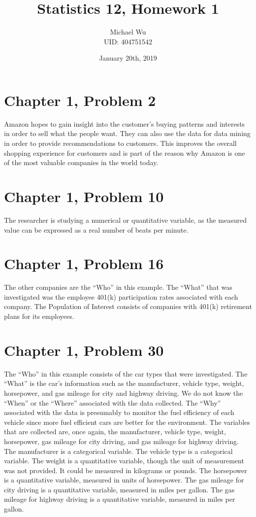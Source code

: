 \documentclass[12pt]{article}
\begin{document}
\title{Statistics 12, Homework 1}
\date{January 20th, 2019}
\author{Michael Wu\\UID: 404751542}
\maketitle

\section*{Chapter 1, Problem 2}

Amazon hopes to gain insight into the customer's buying patterns and interests in order to sell what the people want.
They can also use the data for data mining in order to provide recommendations to customers. This improves the
overall shopping experience for customers and is part of the reason why Amazon is one of the most valuable companies
in the world today.

\section*{Chapter 1, Problem 10}

The researcher is studying a numerical or quantitative variable, as the measured value can be expressed as a
real number of beats per minute.

\section*{Chapter 1, Problem 16}

The other companies are the ``Who'' in this example. The ``What'' that was investigated was the employee 401(k) participation
rates associated with each company. The Population of Interest consists of companies with 401(k) retirement plans
for its employees.

\section*{Chapter 1, Problem 30}

The ``Who'' in this example consists of the car types that were investigated. The ``What'' is the car's information
such as the manufacturer, vehicle type, weight, horsepower, and gas mileage for city and highway
driving. We do not know the ``When'' or the ``Where'' associated with the data collected. The ``Why'' associated with
the data is presumably to monitor the fuel efficiency of each vehicle since more fuel efficient cars are better for
the environment. The variables that are collected are, once again, the manufacturer, vehicle type, weight, horsepower, gas
mileage for city driving, and gas mileage for highway driving. The manufacturer is a categorical variable. The vehicle type
is a categorical variable. The weight is a quantitative variable, though the unit of measurement was not provided. It could
be measured in kilograms or pounds. The horsepower is a quantitative variable, measured in units of horsepower. The gas mileage
for city driving is a quantitative variable, measured in miles per gallon. The gas mileage for highway driving is a quantitative
variable, measured in miles per gallon.
\end{document}
